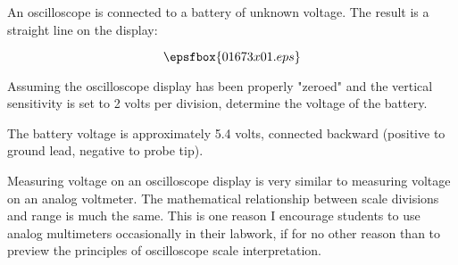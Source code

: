 

An oscilloscope is connected to a battery of unknown voltage.  The result is a straight line on the display:

$$\epsfbox{01673x01.eps}$$

Assuming the oscilloscope display has been properly "zeroed" and the vertical sensitivity is set to 2 volts per division, determine the voltage of the battery.







The battery voltage is approximately 5.4 volts, connected backward (positive to ground lead, negative to probe tip).







Measuring voltage on an oscilloscope display is very similar to measuring voltage on an analog voltmeter.  The mathematical relationship between scale divisions and range is much the same.  This is one reason I encourage students to use analog multimeters occasionally in their labwork, if for no other reason than to preview the principles of oscilloscope scale interpretation.




